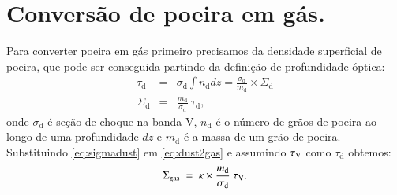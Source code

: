 \section{Conversão de poeira em gás.}
\label{sec:gasfrac:gas2dust}

Para converter poeira em gás primeiro precisamos da densidade superficial de poeira, que pode ser
conseguida partindo da definição de profundidade óptica:
\begin{eqnarray}
	\tau_{\mathrm{d}} &=& \sigma_{\mathrm{d}} \int n_{\mathrm{d}} dz =
	\frac{\sigma_{\mathrm{d}}}{m_{\mathrm{d}}}\times\Sigma_{\mathrm{d}}
	\\
	\Sigma_{\mathrm{d}} &=& \frac{m_{\mathrm{d}}}{\sigma_{\mathrm{d}}}\ \tau_{\mathrm{d}},
	\label{eq:sigmadust}
\end{eqnarray}
\noindent onde $\sigma_{\mathrm{d}}$ é seção de choque na banda V, $n_{\mathrm{d}}$ é o número de
grãos de poeira ao longo de uma profundidade $dz$ e $m_{\mathrm{d}}$ é a massa de um grão de poeira.
Substituindo \eqref{eq:sigmadust} em \eqref{eq:dust2gas} e assumindo $\tau_{\mathrm{V}}$ como $\tau_{\mathrm{d}}$ obtemos:
\begin{equation}
	\Sigma_{\mathrm{gas}}\ =\ \kappa \times \frac{m_{\mathrm{d}}}{\sigma_{\mathrm{d}}}\ \tau_{\mathrm{V}}. 
	\label{eq:dust2gas_tauV}
\end{equation}

